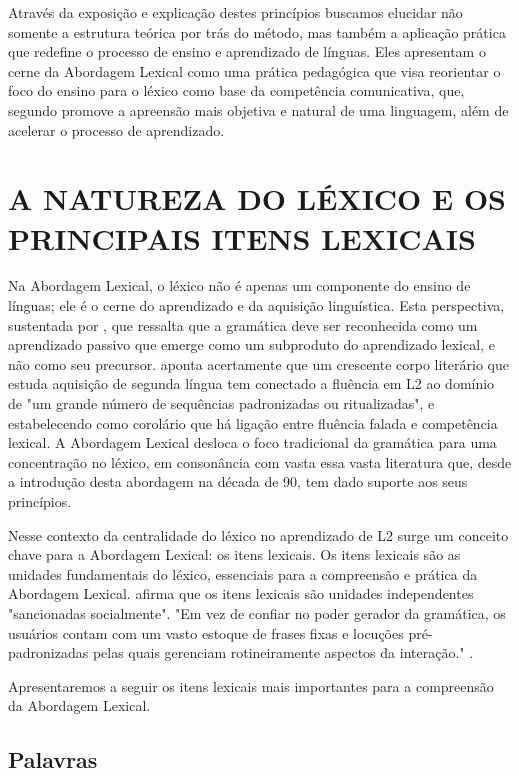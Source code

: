 Através da exposição e explicação destes princípios buscamos elucidar não somente a estrutura teórica por trás do método, mas também a aplicação prática que redefine o processo de ensino e aprendizado de línguas. Eles apresentam o cerne da Abordagem Lexical como uma prática pedagógica que visa reorientar o foco do ensino para o léxico como base da competência comunicativa, que, segundo  promove a apreensão mais objetiva e natural de uma linguagem, além de acelerar o processo de aprendizado.

\section{A NATUREZA DO LÉXICO E OS PRINCIPAIS ITENS LEXICAIS}


Na Abordagem Lexical, o léxico não é apenas um componente do ensino de línguas; ele é o cerne do aprendizado e da aquisição linguística. Esta perspectiva, sustentada por , que ressalta que a gramática deve ser reconhecida como um aprendizado passivo que emerge como um subproduto do aprendizado lexical, e não como seu precursor.  aponta acertamente que um crescente corpo literário que estuda aquisição de segunda língua tem conectado a fluência em L2 ao domínio de "um grande número de sequências padronizadas ou ritualizadas", e estabelecendo como corolário que há ligação entre fluência falada e competência lexical. A Abordagem Lexical desloca o foco tradicional da gramática para uma concentração no léxico, em consonância com vasta essa vasta literatura que, desde a introdução desta abordagem na década de 90, tem dado suporte aos seus princípios.

Nesse contexto da centralidade do léxico no aprendizado de L2 surge um conceito chave para a Abordagem Lexical: os itens lexicais. Os itens lexicais são as unidades fundamentais do léxico, essenciais para a compreensão e prática da Abordagem Lexical.  afirma que os itens lexicais são unidades independentes "sancionadas socialmente". "Em vez de confiar no poder gerador da gramática, os usuários contam com um vasto estoque de frases fixas e locuções pré-padronizadas pelas quais gerenciam rotineiramente aspectos da interação." \cite[p. 90]{lewis1993}.

Apresentaremos a seguir os itens lexicais mais importantes para a compreensão da Abordagem Lexical.

\subsection{Palavras}

